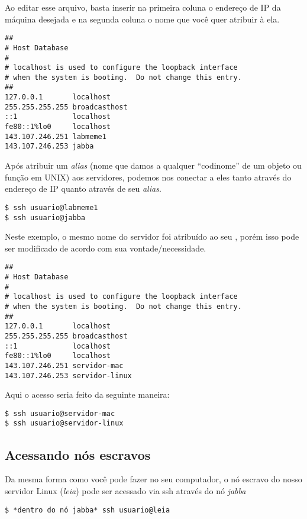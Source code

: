 \documentclass[]{article}
\begin{document}
Ao editar esse arquivo, basta inserir na primeira coluna o endereço de
IP da máquina desejada e na segunda coluna o nome que você quer atribuir
à ela.

\begin{verbatim}
##
# Host Database
#
# localhost is used to configure the loopback interface
# when the system is booting.  Do not change this entry.
##
127.0.0.1       localhost
255.255.255.255 broadcasthost
::1             localhost
fe80::1%lo0     localhost
143.107.246.251 labmeme1
143.107.246.253 jabba
\end{verbatim}

Após atribuir um \emph{alias} (nome que damos a qualquer ``codinome'' de
um objeto ou função em UNIX) aos servidores, podemos nos conectar a eles
tanto através do endereço de IP quanto através de seu \emph{alias}.

\begin{verbatim}
$ ssh usuario@labmeme1
$ ssh usuario@jabba
\end{verbatim}

Neste exemplo, o mesmo nome do servidor foi atribuído ao seu , porém
isso pode ser modificado de acordo com sua vontade/necessidade.

\begin{verbatim}
##
# Host Database
#
# localhost is used to configure the loopback interface
# when the system is booting.  Do not change this entry.
##
127.0.0.1       localhost
255.255.255.255 broadcasthost
::1             localhost
fe80::1%lo0     localhost
143.107.246.251 servidor-mac
143.107.246.253 servidor-linux
\end{verbatim}

Aqui o acesso seria feito da seguinte maneira:

\begin{verbatim}
$ ssh usuario@servidor-mac
$ ssh usuario@servidor-linux
\end{verbatim}

\subsection{Acessando nós escravos}\label{acessando-nos-escravos}

Da mesma forma como você pode fazer no seu computador, o nó escravo do
nosso servidor Linux (\emph{leia}) pode ser acessado via ssh através do
nó \emph{jabba}

\begin{verbatim}
$ *dentro do nó jabba* ssh usuario@leia
\end{verbatim}
\end{document}

